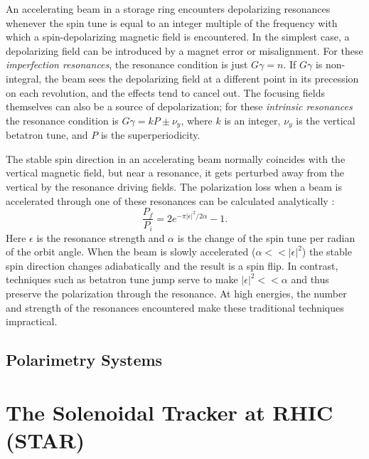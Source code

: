 An accelerating beam in a storage ring encounters depolarizing resonances whenever the spin tune is equal to an integer multiple of the frequency with which a spin-depolarizing magnetic field is encountered.  In the simplest case, a depolarizing field can be introduced by a magnet error or misalignment.  For these \textit{imperfection resonances}, the resonance condition is just $G\gamma = n$.  If $G\gamma$ is non-integral, the beam sees the depolarizing field at a different point in its precession on each revolution, and the effects tend to cancel out.  The focusing fields themselves can also be a source of depolarization; for these \textit{intrinsic resonances} the resonance condition is $G\gamma = kP \pm \nu_y$, where $k$ is an integer, $\nu_y$ is the vertical betatron tune, and $P$ is the superperiodicity.

The stable spin direction in an accelerating beam normally coincides with the vertical magnetic field, but near a resonance, it gets perturbed away from the vertical by the resonance driving fields.  The polarization loss when a beam is accelerated through one of these resonances can be calculated analytically \cite{}:
%
\begin{equation}
  \frac{P_f}{P_i} = 2 e^{-\pi |\epsilon|^2 / 2\alpha} -1.
\end{equation}
%
Here $\epsilon$ is the resonance strength and $\alpha$ is the change of the spin tune per radian of the orbit angle.  When the beam is slowly accelerated ($\alpha << |\epsilon|^2$) the stable spin direction changes adiabatically and the result is a spin flip.  In contrast, techniques such as betatron tune jump serve to make $|\epsilon|^2 << \alpha$ and thus preserve the polarization through the resonance.  At high energies, the number and strength of the resonances encountered make these traditional techniques impractical.





\subsection{Polarimetry Systems}

\cite{Jinnouchi:2004up} %
\cite{Okada:2006dd} %


\section{The Solenoidal Tracker at RHIC (STAR)}

